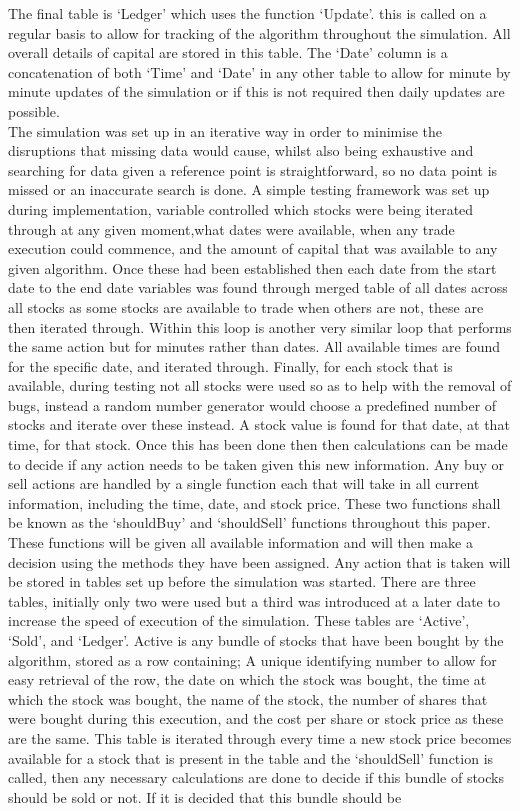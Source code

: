 \documentclass[conference]{IEEEtran}
\begin{document}
The final table is `Ledger' which uses the function `Update'. this is called on a regular basis to allow for tracking of the algorithm throughout the simulation. All overall details of capital are stored in this table. The `Date' column is a concatenation of both `Time' and `Date' in any other table to allow for minute by minute updates of the simulation or if this is not required then daily updates are possible.\\

\iffalse
The simulation was set up in an iterative way in order to minimise the disruptions that missing data would cause, whilst also being exhaustive and searching for data given a reference point is straightforward, so no data point is missed or an inaccurate search is done. A simple testing framework was set up during implementation, variable controlled which stocks were being iterated through at any given moment,what dates were available, when any trade execution could commence, and the amount of capital that was available to any given algorithm. Once these had been established then each date from the start date to the end date variables was found through merged table of all dates across all stocks as some stocks are available to trade when others are not, these are then iterated through. Within this loop is another very similar loop that performs the same action but for minutes rather than dates. All available times are found for the specific date, and iterated through. Finally, for each stock that is available, during testing not all stocks were used so as to help with the removal of bugs, instead a random number generator would choose a predefined number of stocks and iterate over these instead. A stock value is found for that date, at that time, for that stock. Once this has been done then then calculations can be made to decide if any action needs to be taken given this new information. Any buy or sell actions are handled by a single function each that will take in all current information, including the time, date, and stock price. These two functions shall be known as the `shouldBuy' and `shouldSell' functions throughout this paper. These functions will be given all available information and will then make a decision using the methods they have been assigned. Any action that is taken will be stored in tables set up before the simulation was started. There are three tables, initially only two were used but a third was introduced at a later date to increase the speed of execution of the simulation. These tables are `Active', `Sold', and `Ledger'. Active is any bundle of stocks that have been bought by the algorithm, stored as a row containing; A unique identifying number to allow for easy retrieval of the row, the date on which the stock was bought, the time at which the stock was bought, the name of the stock, the number of shares that were bought during this execution, and the cost per share or stock price as these are the same. This table is iterated through every time a new stock price becomes available for a stock that is present in the table and the `shouldSell' function is called, then any necessary calculations are done to decide if this bundle of stocks should be sold or not. If it is decided that this bundle should be 
\end{document}
